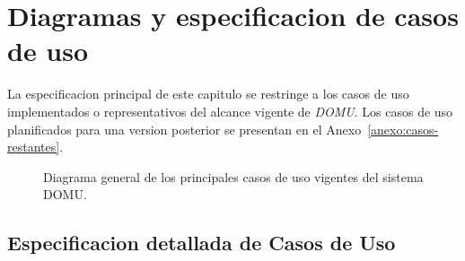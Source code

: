 \section{Diagramas y especificacion de casos de uso}

La especificacion principal de este capitulo se restringe a los casos de uso implementados o representativos del alcance vigente de \textit{DOMU}. Los casos de uso planificados para una version posterior se presentan en el Anexo~\ref{anexo:casos-restantes}.

\begin{figure}[H]
  \centering
  \caption{Diagrama general de los principales casos de uso vigentes del sistema DOMU.}
  \label{fig:diagrama-cu}
\end{figure}

\subsection{Especificacion detallada de Casos de Uso}


